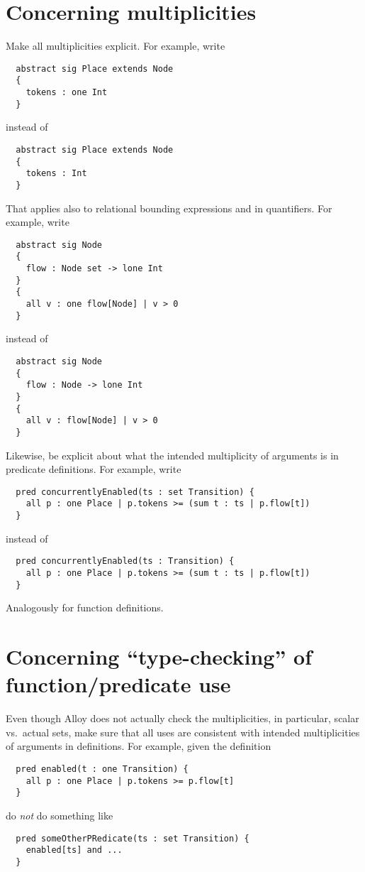 \documentclass{article}
\begin{document}
\section*{Concerning multiplicities}

Make all multiplicities explicit.
For example, write
\begin{lstlisting}
  abstract sig Place extends Node
  {
    tokens : one Int
  }
\end{lstlisting}
instead of
\begin{lstlisting}
  abstract sig Place extends Node
  {
    tokens : Int
  }
\end{lstlisting}
That applies also to relational bounding expressions and in quantifiers.
For example, write
\begin{lstlisting}
  abstract sig Node
  {
    flow : Node set -> lone Int
  }
  {
    all v : one flow[Node] | v > 0
  }
\end{lstlisting}
instead of
\begin{lstlisting}
  abstract sig Node
  {
    flow : Node -> lone Int
  }
  {
    all v : flow[Node] | v > 0
  }
\end{lstlisting}
Likewise, be explicit about what the intended multiplicity of arguments is in predicate definitions.
For example, write
\begin{lstlisting}
  pred concurrentlyEnabled(ts : set Transition) {
    all p : one Place | p.tokens >= (sum t : ts | p.flow[t])
  }
\end{lstlisting}
instead of
\begin{lstlisting}
  pred concurrentlyEnabled(ts : Transition) {
    all p : one Place | p.tokens >= (sum t : ts | p.flow[t])
  }
\end{lstlisting}
Analogously for function definitions.

\section*{Concerning ``type-checking'' of function/predicate use}

Even though Alloy does not actually check the multiplicities, in particular, scalar vs.\ actual sets, make sure that all uses are consistent with intended multiplicities of arguments in definitions.
For example, given the definition
\begin{lstlisting}
  pred enabled(t : one Transition) {
    all p : one Place | p.tokens >= p.flow[t]
  }
\end{lstlisting}
do \emph{not} do something like
\begin{lstlisting}
  pred someOtherPRedicate(ts : set Transition) {
    enabled[ts] and ...
  }
\end{lstlisting}
\end{document}
